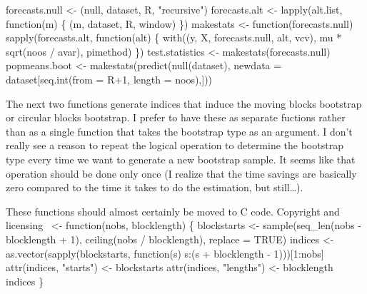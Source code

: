 \documentclass[10pt]{article}%
\begin{document}
\nwenddocs{}\endmoddef\nwstartdeflinemarkup{}\nwenddeflinemarkup
forecasts.null <- (null, dataset, R, "recursive")
forecasts.alt <- lapply(alt.list, function(m) \{
  (m, dataset, R, window)
\})
makestats <- function(forecasts.null) sapply(forecasts.alt, function(alt) \{
  with((y, X, forecasts.null, alt, vcv),
       mu * sqrt(noos / avar), pimethod)
\})
test.statistics <- makestats(forecasts.null)
popmeans.boot <- makestats(predict(null(dataset),
                           newdata = dataset[seq.int(from = R+1, length = noos),]))
\nwendcode{}\nwdocspar

The next two functions generate indices that induce the moving blocks
bootstrap or circular blocks bootstrap.  I prefer to have these as
separate fuctions rather than as a single function that takes the
bootstrap type as an argument.  I don't really see a reason to repeat
the logical operation to determine the bootstrap type every time we
want to generate a new bootstrap sample.  It seems like that
operation should be done only once (I realize that the time savings
are basically zero compared to the time it takes to do the estimation,
but still\dots).

These functions should almost certainly be moved to C code. 
\nwenddocs{}\endmoddef\nwstartdeflinemarkup\nwenddeflinemarkup
\LA{}Copyright and licensing~{\nwtagstyle{}}\RA{}
 <- function(nobs, blocklength) \{
  blockstarts <- sample(seq_len(nobs - blocklength + 1),
                        ceiling(nobs / blocklength),
                        replace = TRUE)
  indices <- 
    as.vector(sapply(blockstarts, function(s) s:(s + blocklength - 1)))[1:nobs]
  attr(indices, "starts") <- blockstarts
  attr(indices, "lengths") <- blocklength
  indices
\}
\end{document}
